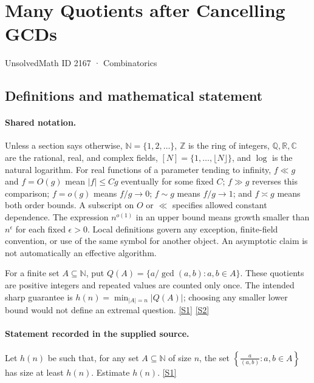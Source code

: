 \documentclass[11pt,a4paper]{article}
\newcommand{\N}{\mathbb{N}}
\newcommand{\Z}{\mathbb{Z}}
\newcommand{\Q}{\mathbb{Q}}
\newcommand{\R}{\mathbb{R}}
\newcommand{\C}{\mathbb{C}}
\newcommand{\sref}[2]{\hyperlink{source:#1:#2}{[S#2]}}
\begin{document}

\setcounter{section}{2166}

\section{Many Quotients after Cancelling GCDs}\label{2167}

{\small\sffamily UnsolvedMath ID 2167 · Combinatorics}

\subsection{Definitions and mathematical statement}

\paragraph{Shared notation.}Unless a section says otherwise, $\N=\{1,2,\ldots\}$,
$\Z$ is the ring of integers, $\Q,\R,\C$ are the rational, real, and complex
fields, $[N]=\{1,\ldots,\lfloor N\rfloor\}$, and $\log$ is the natural
logarithm. For real functions of a parameter tending to infinity,
$f\ll g$ and $f=O(g)$ mean $|f|\leq Cg$ eventually for some fixed $C$;
$f\gg g$ reverses this comparison; $f=o(g)$ means $f/g\to0$;
$f\sim g$ means $f/g\to1$; and $f\asymp g$ means both order bounds.
A subscript on $O$ or $\ll$ specifies allowed constant dependence.
The expression $n^{o(1)}$ in an upper bound means growth smaller than
$n^\epsilon$ for each fixed $\epsilon>0$. Local definitions govern any
exception, finite-field convention, or use of the same symbol for another
object. An asymptotic claim is not automatically an effective algorithm.



For a finite set $A\subseteq\N$, put $Q(A)=\{a/\gcd(a,b):a,b\in A\}$. These quotients are positive integers and repeated values are counted only once. The intended sharp guarantee is $h(n)=\min_{|A|=n}|Q(A)|$; choosing any smaller lower bound would not define an extremal question. \sref{2167}{1} \sref{2167}{2}

\paragraph{Statement recorded in the supplied source.}
Let $h(n)$ be such that, for any set $A\subseteq \mathbb{N}$ of size $n$, the set $ \left\{ \frac{a}{(a,b)}: a,b\in A\right\} $ has size at least $h(n)$. Estimate $h(n)$. \sref{2167}{1}
\end{document}

